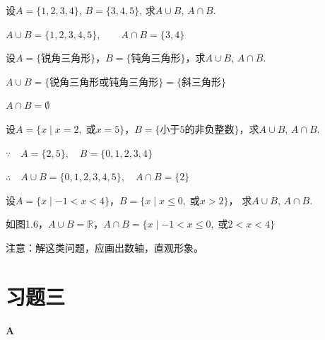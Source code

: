 \begin{example}
    设$A=\{1,2,3,4\}$, $B=\{3,4,5\}$, 求$A\cup B$, 
$A\cap B$.
\end{example}

\begin{solution}
    $A\cup B=\{1,2,3,4,5\},\qquad A\cap B=\{3,4\}$
\end{solution}

\begin{example}
    设$A=\{\text{锐角三角形}\}$，$B=\{\text{钝角三角形}\}$，求$A\cup B$, 
    $A\cap B$.
\end{example}

\begin{solution}
$A\cup B=\{\text{锐角三角形或钝角三角形}\}=\{\text{斜三角形
}\}$

$A\cap B=\emptyset$
\end{solution}

\begin{example}
    设$A=\{x\mid x=2,\;\text{或}x=5\}$，$B=\{
\text{小于5的非负整数}\}$，求$A\cup B$, $A\cap B$.
\end{example}

\begin{solution}
    $\because\quad A=\{2,5\},\quad B=\{0,1,2,3,4\}$

    $\therefore\quad A\cup B=\{0,1,2,3,4,5\},\quad A\cap B=\{2\}$
\end{solution}

\begin{example}
  设$A=\{x\mid -1<x<4\}$，$B=\{x\mid x\le 0,\; \text{或}x>2\}$，  求$A\cup B$, $A\cap B$.
\end{example}

\begin{solution}
    如图1.6，$A\cup B=\mathbb{R}$，$A\cap B=\{x\mid -1<x\le 0,\;\text{或}2<x<4\}$

注意：解这类问题，应画出数轴，直观形象。
\end{solution}


\section*{习题三}
\begin{center}
    \bfseries A
\end{center}

